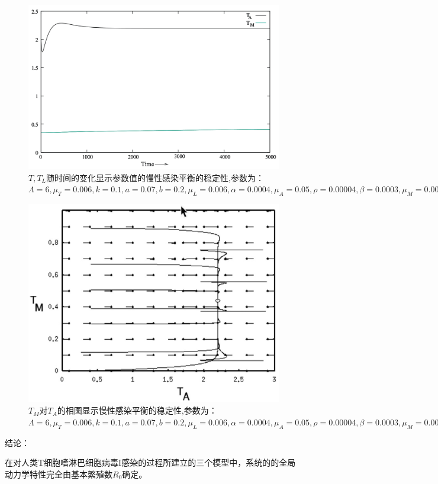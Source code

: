 \documentclass[12pt,a4paper]{article}
\begin{document}
{	\begin{figure}[H]
		\centering
		\includegraphics[width=4.5in]{Snip20190310_7.png}
		\caption
		{$T,T_{L}$随时间的变化显示参数值的慢性感染平衡的稳定性,参数为：
		$\Lambda=6,\mu_{T}=0.006,k=0.1, a=0.07,b=0.2,\mu_{L}=0.006,\alpha=0.0004,
		\mu_{A}=0.05,\rho=0.00004,\beta=0.0003,\mu_{M}=0.0005,T_{M_{max}}=2200$}
	\end{figure}

	\begin{figure}[H]
		\centering
		\includegraphics[width=4.5in]{Snip20190310_8.png}
		\caption
		{$T_{M}对T_{A}$的相图显示慢性感染平衡的稳定性,参数为：
		$\Lambda=6,\mu_{T}=0.006,k=0.1, a=0.07,b=0.2,\mu_{L}=0.006,\alpha=0.0004,
		\mu_{A}=0.05,\rho=0.00004,\beta=0.0003,\mu_{M}=0.0005,T_{M_{max}}=2200$}
	\end{figure}

	\noindent 结论：


	在对人类T细胞嗜淋巴细胞病毒I感染的过程所建立的三个模型中，系统的的全局动力学特性完全由基本繁殖数$R_{0}$确定。\\\\

}
\end{document}
